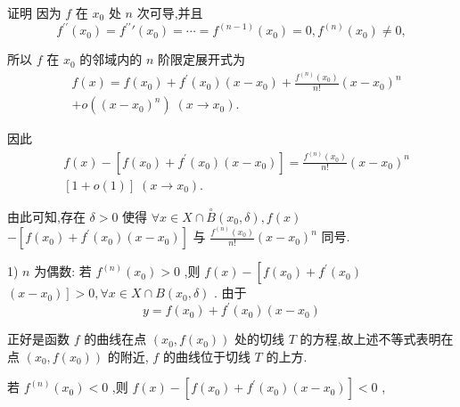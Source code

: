 证明 因为 $f$ 在 ${x}_{0}$ 处 $n$ 次可导,并且
$${f}^{\prime \prime }\left( {x}_{0}\right)  = {f}^{\prime \prime }\prime \left( {x}_{0}\right)  = \cdots  = {f}^{\left( n - 1\right) }\left( {x}_{0}\right)  = 0,{f}^{\left( n\right) }\left( {x}_{0}\right)  \neq  0,$$

所以 $f$ 在 ${x}_{0}$ 的邻域内的 $n$ 阶限定展开式为
\begin{align*}
	&f\left( x\right)  = f\left( {x}_{0}\right)  + {f}^{\prime }\left( {x}_{0}\right) \left( {x - {x}_{0}}\right)  + \frac{{f}^{\left( n\right) }\left( {x}_{0}\right) }{n!}{\left( x - {x}_{0}\right) }^{n}\\
	&+ o\left( {\left( x - {x}_{0}\right) }^{n}\right) \;\left( {x \rightarrow  {x}_{0}}\right) .
\end{align*}

因此
\begin{align*}
	&f\left( x\right)  - \left\lbrack  {f\left( {x}_{0}\right)  + {f}^{\prime }\left( {x}_{0}\right) \left( {x - {x}_{0}}\right) }\right\rbrack   = \frac{{f}^{\left( n\right) }\left( {x}_{0}\right) }{n!}{\left( x - {x}_{0}\right) }^{n}\\
	&\left\lbrack  {1 + o\left( 1\right) }\right\rbrack  \;\left( {x \rightarrow  {x}_{0}}\right) .
\end{align*}

由此可知,存在 $\delta  > 0$ 使得 $\forall x \in  X \cap  \overset{ \circ  }{B}\left( {{x}_{0},\delta }\right) ,f\left( x\right)$  $- \left\lbrack  {f\left( {x}_{0}\right)  + {f}^{\prime }\left( {x}_{0}\right) \left( {x - {x}_{0}}\right) }\right\rbrack$ 与 $\frac{{f}^{\left( n\right) }\left( {x}_{0}\right) }{n!}{\left( x - {x}_{0}\right) }^{n}$ 同号.

1) $n$ 为偶数: 若 ${f}^{\left( n\right) }\left( {x}_{0}\right)  > 0$ ,则 $f\left( x\right)  - \left\lbrack  {f\left( {x}_{0}\right)  + {f}^{\prime }\left( {x}_{0}\right) }\right.$  $\left. \left( {x - {x}_{0}}\right) \right\rbrack   > 0,\forall x \in  X \cap  B\left( {{x}_{0},\delta }\right)$ . 由于
$$y = f\left( {x}_{0}\right)  + {f}^{\prime }\left( {x}_{0}\right) \left( {x - {x}_{0}}\right)$$

正好是函数 $f$ 的曲线在点 $\left( {{x}_{0},f\left( {x}_{0}\right) }\right)$ 处的切线 $T$ 的方程,故上述不等式表明在点 $\left( {{x}_{0},f\left( {x}_{0}\right) }\right)$ 的附近, $f$ 的曲线位于切线 $T$ 的上方.

若 ${f}^{\left( n\right) }\left( {x}_{0}\right)  < 0$ ,则 $f\left( x\right)  - \left\lbrack  {f\left( {x}_{0}\right)  + {f}^{\prime }\left( {x}_{0}\right) \left( {x - {x}_{0}}\right) }\right\rbrack   < 0$ ,

